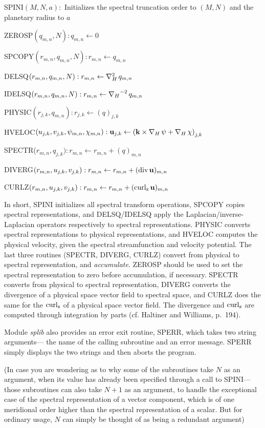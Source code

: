 \smallskip
\litem SPINI$(M,N,a):$ Initializes the spectral truncation order to $(M,N)$ and
the planetary radius to $a$ \smallskip
 
\litem ZEROSP$(q_{m,n},N): q_{m,n} \gets 0$ \smallskip
 
\litem SPCOPY$(r_{m,n},q_{m,n},N): r_{m,n} \gets q_{m,n}$ \smallskip
 
\litem DELSQ$(r_{m,n},q_{m,n},N): r_{m,n} \gets \mathop{\nabla_H^2} q_{m,n}$ \smallskip
 
\litem IDELSQ$(r_{m,n},q_{m,n},N): r_{m,n} \gets \mathop{{{\bf\nabla}}_H}^{-2} q_{m,n}$ \smallskip
 
\litem PHYSIC$(r_{j,k},q_{m,n}): r_{j,k} \gets (q)_{j,k}$ \smallskip
 
\litem HVELOC$(u_{j,k},v_{j,k},\psi_{m,n},\chi_{m,n}):
 {{\bf u}}_{j,k} \gets {({{\bf k}}\times \mathop{{{\bf\nabla}}_H}\psi + \mathop{{{\bf\nabla}}_H}\chi)}_{j,k}$ \smallskip
 
\litem SPECTR($r_{m,n},q_{j,k}): r_{m,n} \gets r_{m,n} + (q)_{m,n}$ \smallskip
 
\litem DIVERG$(r_{m,n},u_{j,k},v_{j,k}):
               r_{m,n} \gets r_{m,n} + (\mathop{\rm div}   {{\bf u}})_{m,n}$ \smallskip
 
\litem CURLZ$(r_{m,n},u_{j,k},v_{j,k}):
               r_{m,n} \gets r_{m,n} + (\mathop{\rm curl_z} {{\bf u}})_{m,n}$ \smallskip
 
In short, SPINI initializes all spectral transform operations, SPCOPY copies
spectral representations, and DELSQ\slash IDELSQ apply the
Laplacian/inverse-Laplacian operators respectively to spectral
representations. PHYSIC converts spectral representations to physical
representations, and HVELOC computes the physical velocity, given the spectral
streamfunction and velocity potential. The last three routines (SPECTR,
DIVERG, CURLZ) convert from physical to spectral representation, and {\sl
accumulate}. ZEROSP should be used to set the spectral representation to zero
before accumulation, if necessary. SPECTR converts from physical to spectral
representation, DIVERG converts the divergence of a physical space vector
field to spectral space, and CURLZ does the same for the $\mathop{\rm curl_z}$ of a
physical space vector field. The divergence and $\mathop{\rm curl_z}$ are computed through
integration by parts (cf. Haltiner and Williams, p.~194).
 
Module {\it splib} also provides an error exit routine, SPERR, which takes two
string arguments--- the name of the calling subroutine and an error message.
SPERR simply displays the two strings and then aborts the program.
 
(In case you are wondering as to why some of the subroutines take $N$ as an
argument, when its value has already been specified through a call to SPINI---
those subroutines can also take $N+1$ as an argument, to handle the
exceptional case of the spectral representation of a vector component, which
is of one meridional order higher than the spectral representation of a
scalar. But for ordinary usage, $N$ can simply be thought of as being a
redundant argument)
 
